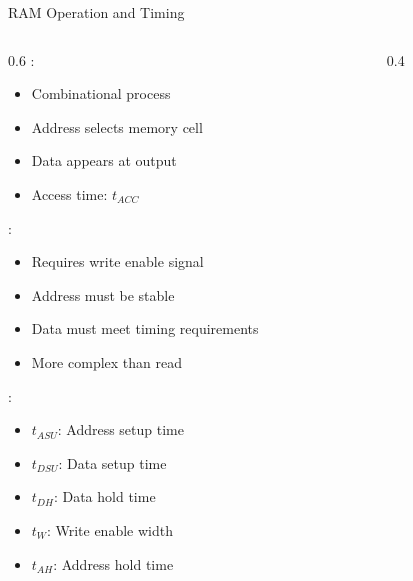\begin{frame}{RAM Operation and Timing}
\begin{columns}
\begin{column}{0.6\textwidth}
:
\begin{itemize}
\item Combinational process
\item Address selects memory cell
\item Data appears at output
\item Access time: $t_{ACC}$
\end{itemize}
\vspace{0.3cm}
:
\begin{itemize}
\item Requires write enable signal
\item Address must be stable
\item Data must meet timing requirements
\item More complex than read
\end{itemize}
\vspace{0.3cm}
:
\begin{itemize}
\item $t_{ASU}$: Address setup time
\item $t_{DSU}$: Data setup time
\item $t_{DH}$: Data hold time
\item $t_{W}$: Write enable width
\item $t_{AH}$: Address hold time
\end{itemize}
\end{column}
\begin{column}{0.4\textwidth}
\begin{center}

\end{center}
\end{column}
\end{columns}
\end{frame}
